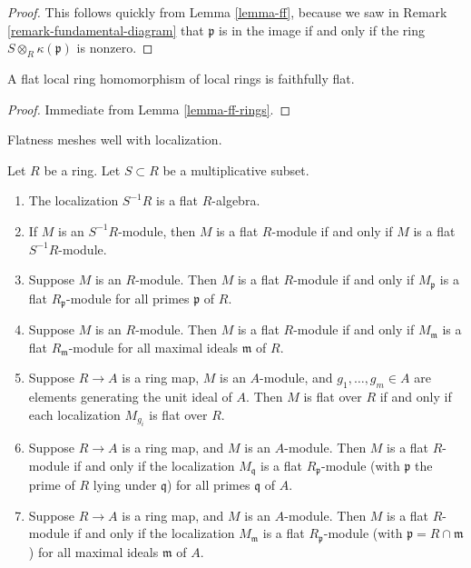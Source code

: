\begin{proof}
This follows quickly from Lemma \ref{lemma-ff}, because we
saw in Remark \ref{remark-fundamental-diagram}
that $\mathfrak p$ is in the image
if and only if the ring $S \otimes_R \kappa(\mathfrak p)$
is nonzero.
\end{proof}

\begin{lemma}
\label{lemma-local-flat-ff}
A flat local ring homomorphism of local rings is faithfully flat.
\end{lemma}

\begin{proof}
Immediate from Lemma \ref{lemma-ff-rings}.
\end{proof}

\noindent
Flatness meshes well with localization.

\begin{lemma}
\label{lemma-flat-localization}
Let $R$ be a ring. Let $S \subset R$ be a multiplicative subset.
\begin{enumerate}
\item The localization $S^{-1}R$ is a flat $R$-algebra.
\item If $M$ is an $S^{-1}R$-module, then $M$ is a flat $R$-module
if and only if $M$ is a flat $S^{-1}R$-module.
\item Suppose $M$ is an $R$-module. Then
$M$ is a flat $R$-module if and only if $M_{\mathfrak p}$ is a flat
$R_{\mathfrak p}$-module for all primes $\mathfrak p$ of $R$.
\item Suppose $M$ is an $R$-module. Then $M$ is a flat $R$-module if
and only if $M_{\mathfrak m}$ is a flat
$R_{\mathfrak m}$-module for all maximal ideals $\mathfrak m$ of $R$.
\item Suppose $R \to A$ is a ring map, $M$ is an $A$-module,
and $g_1, \ldots, g_m \in A$ are elements generating the unit
ideal of $A$. Then $M$ is flat over $R$ if and only if each localization
$M_{g_i}$ is flat over $R$.
\item Suppose $R \to A$ is a ring map, and $M$ is an $A$-module.
Then $M$ is a flat $R$-module if and only if the localization
$M_{\mathfrak q}$ is a flat $R_{\mathfrak p}$-module
(with $\mathfrak p$ the prime of $R$ lying under $\mathfrak q$)
for all primes $\mathfrak q$ of $A$.
\item Suppose $R \to A$ is a ring map, and $M$ is an $A$-module.
Then $M$ is a flat $R$-module if and only if the localization
$M_{\mathfrak m}$ is a flat $R_{\mathfrak p}$-module
(with $\mathfrak p = R \cap \mathfrak m$)
for all maximal ideals $\mathfrak m$ of $A$.
\end{enumerate}
\end{lemma}

